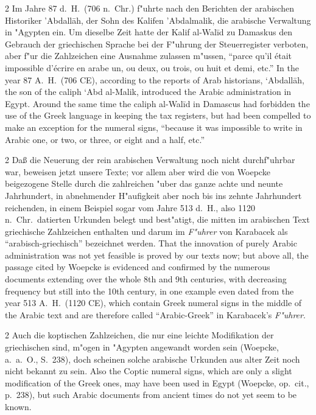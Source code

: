 \documentclass[10pt,a4paper]{article}
\renewcommand{\switchcolumn}{\syncronize\nointerlineskip\columnbreak}
\newcommand{\enquote}[1]{``#1''}
\begin{document}
\begin{paracol}{2}
Im Jahre 87 d.\ H.\ (706 n.\ Chr.) f"uhrte nach den Berichten der arabischen Historiker 'Abdall\=ah, der Sohn des Kalifen 'Abdalmalik, die arabische Verwaltung in "Agypten ein. Um dieselbe Zeit hatte der Kalif al-Wal\={i}d zu Damaskus den Gebrauch der griechischen Sprache bei der F"uhrung der Steuerregister verboten, aber f"ur die Zahlzeichen eine Ausnahme zulassen m"ussen, \enquote{parce qu'il \'etait impossible d'\'ecrire en arabe un, ou deux, ou trois, ou huit et demi, etc.}
\switchcolumn
In the year 87 A.\ H.\ (706 CE), according to the reports of Arab historians, `Abdall\=ah, the son of the caliph `Abd al-Malik, introduced the Arabic administration in Egypt. Around the same time the caliph al-Wal\={i}d in Damascus had forbidden the use of the Greek language in keeping the tax registers, but had been compelled to make an exception for the numeral signs, ``because it was impossible to write in Arabic one, or two, or three, or eight and a half, etc.''
\end{paracol}

\begin{paracol}{2}
Da\ss{} die Neuerung der rein arabischen Verwaltung noch nicht durchf"uhrbar war, beweisen jetzt unsere Texte; vor allem aber wird die von Woepcke beigezogene Stelle durch die zahlreichen "uber das ganze achte und neunte Jahrhundert, in abnehmender H"aufigkeit aber noch bis ins zehnte Jahrhundert reichenden, in einem Beispiel sogar vom Jahre 513 d.\ H., also 1120 n.\ Chr.\ datierten Urkunden belegt und best"atigt, die mitten im arabischen Text griechische Zahlzeichen enthalten und darum im \textit{F"uhrer} von Karabacek als \enquote{arabisch-griechisch} bezeichnet werden.
\switchcolumn
That the innovation of purely Arabic administration was not yet feasible is proved by our texts now; but above all, the passage cited by Woepcke is evidenced and confirmed by the numerous documents extending over the whole 8th and 9th centuries, with decreasing frequency but still into the 10th century, in one example even dated from the year 513 A.\ H.\ (1120 CE), which contain Greek numeral signs in the middle of the Arabic text and are therefore called ``Arabic-Greek'' in Karabacek's \textit{F"uhrer}.
\end{paracol}

\begin{paracol}{2}
Auch die koptischen Zahlzeichen, die nur eine leichte Modifikation der griechischen sind, m"ogen in "Agypten angewandt worden sein (Woepcke, a.\ a.\ O., S.\ 238), doch scheinen solche arabische Urkunden aus alter Zeit noch nicht bekannt zu sein.
\switchcolumn
Also the Coptic numeral signs, which are only a slight modification of the Greek ones, may have been used in Egypt (Woepcke, op.\ cit., p.\ 238), but such Arabic documents from ancient times do not yet seem to be known.
\end{paracol}
\end{document}
